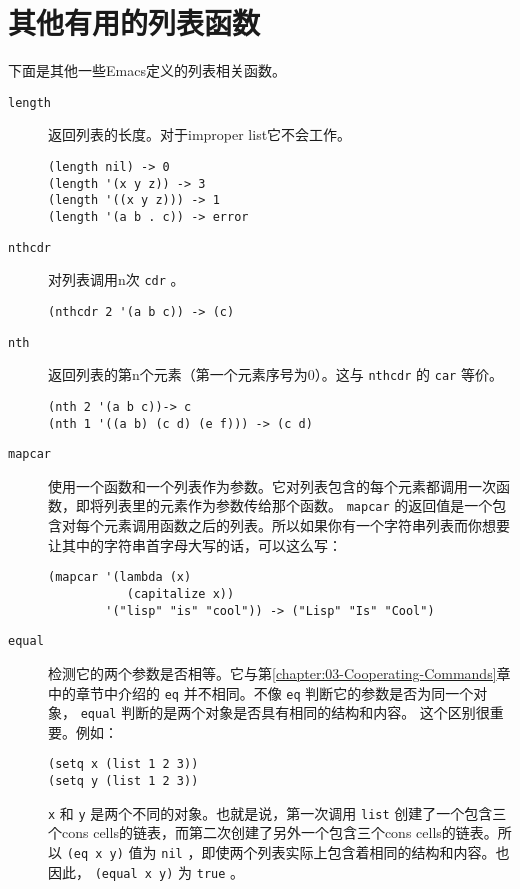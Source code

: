 \section{其他有用的列表函数}
\label{section:06-Other-Useful-List-Functions}

下面是其他一些Emacs定义的列表相关函数。

\begin{description}
  \item[ \texttt{length} ] 返回列表的长度。对于improper list它不会工作。
\begin{verbatim}
(length nil) -> 0
(length '(x y z)) -> 3
(length '((x y z))) -> 1
(length '(a b . c)) -> error
\end{verbatim}
  \item[ \texttt{nthcdr} ] 对列表调用n次 \texttt{cdr} 。
\begin{verbatim}
(nthcdr 2 '(a b c)) -> (c)
\end{verbatim}
  \item[ \texttt{nth} ] 返回列表的第n个元素（第一个元素序号为0）。这与 \texttt{nthcdr} 的 \texttt{car} 等价。
\begin{verbatim}
(nth 2 '(a b c))-> c
(nth 1 '((a b) (c d) (e f))) -> (c d)
\end{verbatim}
  \item[ \texttt{mapcar} ] 使用一个函数和一个列表作为参数。它对列表包含的每个元素都调用一次函数，即将列表里的元素作为参数传给那个函数。 \texttt{mapcar} 的返回值是一个包含对每个元素调用函数之后的列表。所以如果你有一个字符串列表而你想要让其中的字符串首字母大写的话，可以这么写：
\begin{verbatim}
(mapcar '(lambda (x)
           (capitalize x))
        '("lisp" "is" "cool")) -> ("Lisp" "Is" "Cool")
\end{verbatim}
  \item[ \texttt{equal} ] 检测它的两个参数是否相等。它与第\ref{chapter:03-Cooperating-Commands}章中的章节中介绍的 \texttt{eq} 并不相同。不像 \texttt{eq} 判断它的参数是否为同一个对象， \texttt{equal} 判断的是两个对象是否具有相同的结构和内容。
这个区别很重要。例如：
\begin{verbatim}
(setq x (list 1 2 3))
(setq y (list 1 2 3))
\end{verbatim}
 \texttt{x} 和 \texttt{y} 是两个不同的对象。也就是说，第一次调用 \texttt{list} 创建了一个包含三个cons cells的链表，而第二次创建了另外一个包含三个cons cells的链表。所以 \texttt{(eq x y)} 值为 \texttt{nil} ，即使两个列表实际上包含着相同的结构和内容。也因此， \texttt{(equal x y)} 为 \texttt{true} 。

\end{description}
